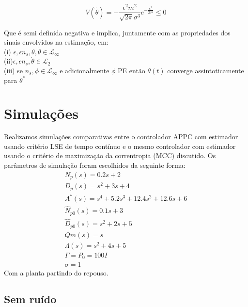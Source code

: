 \documentclass[conference,harvard,brazil,english]{sbatex}
\begin{document}
\begin{equation}
\displaystyle 
\dot{V}(\tilde{\theta}) = -\frac{\epsilon^2 m^2}{\sqrt{2\pi}\sigma^3}e^{-\frac{\epsilon^2}{2\sigma^2}} \leq 0
\end{equation}

Que é semi definida negativa e implica, juntamente com as propriedades dos sinais envolvidos na estimação, em:\\
\flushleft
(i) $\epsilon, \epsilon n_s, \theta, \dot{\theta} \in \mathcal{L}_\infty$\\
(ii)$ \epsilon, \epsilon n_s, \dot{\theta} \in \mathcal{L}_2$\\
(iii) se $n_s, \phi \in \mathcal{L}_\infty$ e adicionalmente $\phi$ PE então $\theta(t)$ converge assintoticamente para $\theta^*$


\section{Simulações}



Realizamos simulações comparativas entre o controlador APPC com estimador usando critério LSE de tempo contínuo e o mesmo controlador com estimador usando o critério de maximização da correntropia (MCC) discutido. Os parâmetros de simulação foram escolhidos da seguinte forma:
\begin{equation}
\label{eq:Distribuição do ruído}
\displaystyle 
\begin{array}{l}
       N_p(s)          = 0.2s+2\\
       D_p(s)          = s^2+3s+4\\
       A^*(s)          = s^4+5.2s^3+12.4s^2+12.6s+6\\
       \hat{N}_{p0}(s) = 0.1s+3  \\
       \hat{D}_{p0}(s) = s^2+2s+5\\
       Qm(s)           = s       \\ 
       \Lambda(s)      = s^2+4s+5\\
       \Gamma = P_0 = 100I \\
       \sigma = 1
\end{array}
\end{equation}
Com a planta partindo do repouso. 

\subsection{Sem ruído}
\end{document}
